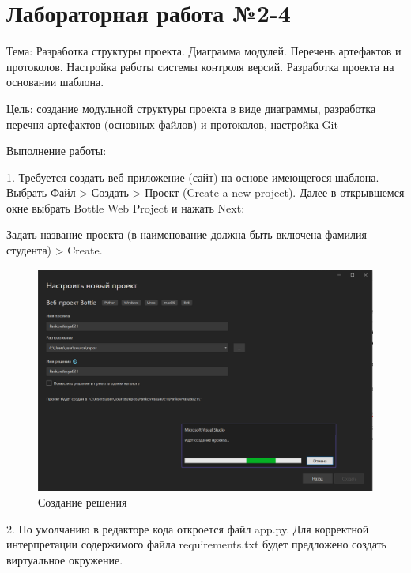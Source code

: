\documentclass[14pt]{extarticle}
\begin{document}
\tableofcontents \clearpage

\section{Лабораторная работа №2-4}
\label{sec:orgc0008a6}

Тема: Разработка структуры проекта. Диаграмма модулей. Перечень артефактов и протоколов. Настройка работы системы контроля версий. Разработка проекта на основании шаблона. 

Цель: создание модульной структуры проекта в виде диаграммы, разработка перечня артефактов (основных файлов) и протоколов, настройка Git 


Выполнение работы:

​1. Требуется создать веб-приложение (сайт) на основе имеющегося шаблона. Выбрать Файл > Создать > Проект (Create a new project). Далее в открывшемся окне выбрать Bottle Web Project и нажать Next: 

Задать название проекта (в наименование должна быть включена фамилия студента) > Create.

\begin{figure}[H]
\centering
\includegraphics[width=.9\linewidth]{images/20230323-120448_screenshot.png}
\caption{Создание решения}
\end{figure}


​2. По умолчанию в редакторе кода откроется файл app.py. Для корректной интерпретации содержимого файла requirements.txt будет предложено создать виртуальное окружение.
\end{document}
